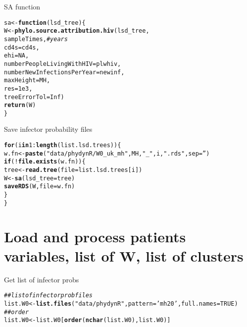 \documentclass[]{revtex4}\usepackage[]{graphicx}\usepackage[]{color}
\makeatletter
\newcommand{\hlnum}[1]{\textcolor[rgb]{0.686,0.059,0.569}{#1}}%
\newcommand{\hlstr}[1]{\textcolor[rgb]{0.192,0.494,0.8}{#1}}%
\newcommand{\hlcom}[1]{\textcolor[rgb]{0.678,0.584,0.686}{\textit{#1}}}%
\newcommand{\hlopt}[1]{\textcolor[rgb]{0,0,0}{#1}}%
\newcommand{\hlstd}[1]{\textcolor[rgb]{0.345,0.345,0.345}{#1}}%
\newcommand{\hlkwa}[1]{\textcolor[rgb]{0.161,0.373,0.58}{\textbf{#1}}}%
\newcommand{\hlkwb}[1]{\textcolor[rgb]{0.69,0.353,0.396}{#1}}%
\newcommand{\hlkwc}[1]{\textcolor[rgb]{0.333,0.667,0.333}{#1}}%
\newcommand{\hlkwd}[1]{\textcolor[rgb]{0.737,0.353,0.396}{\textbf{#1}}}%
\newenvironment{kframe}{%
 \def\at@end@of@kframe{}%
 \ifinner\ifhmode%
  \def\at@end@of@kframe{\end{minipage}}%
  \begin{minipage}{\columnwidth}%
 \fi\fi%
 \def\FrameCommand##1{\hskip\@totalleftmargin \hskip-\fboxsep
 \colorbox{shadecolor}{##1}\hskip-\fboxsep
     \hskip-\linewidth \hskip-\@totalleftmargin \hskip\columnwidth}%
 \MakeFramed {\advance\hsize-\width
   \@totalleftmargin\z@ \linewidth\hsize
   \@setminipage}}%
 {\par\unskip\endMakeFramed%
 \at@end@of@kframe}
\newenvironment{knitrout}{}{} %
\makeatother
\begin{document}
SA function
\begin{knitrout}
\color{fgcolor}\begin{kframe}
\begin{alltt}
\hlstd{sa} \hlkwb{<-} \hlkwa{function}\hlstd{(}\hlkwc{lsd_tree}\hlstd{)\{}
  \hlstd{W} \hlkwb{<-} \hlkwd{phylo.source.attribution.hiv}\hlstd{( lsd_tree,}
          \hlstd{sampleTimes,} \hlcom{# years}
          \hlkwc{cd4s} \hlstd{= cd4s,}
          \hlkwc{ehi} \hlstd{=} \hlnum{NA}\hlstd{,}
          \hlkwc{numberPeopleLivingWithHIV} \hlstd{= plwhiv,}
          \hlkwc{numberNewInfectionsPerYear} \hlstd{= newinf,}
          \hlkwc{maxHeight} \hlstd{= MH,}
          \hlkwc{res} \hlstd{=} \hlnum{1e3}\hlstd{,}
          \hlkwc{treeErrorTol} \hlstd{=} \hlnum{Inf}\hlstd{)}
  \hlkwd{return}\hlstd{(W)}
\hlstd{\}}
\end{alltt}
\end{kframe}
\end{knitrout}
Save infector probability files
\begin{knitrout}
\color{fgcolor}\begin{kframe}
\begin{alltt}
\hlkwa{for} \hlstd{(i} \hlkwa{in} \hlnum{1}\hlopt{:}\hlkwd{length}\hlstd{(list.lsd.trees))\{}
  \hlstd{w.fn} \hlkwb{<-} \hlkwd{paste}\hlstd{(}\hlstr{"data/phydynR/W0_uk_mh"}\hlstd{, MH,} \hlstr{"_"}\hlstd{,  i,} \hlstr{".rds"}\hlstd{,} \hlkwc{sep} \hlstd{=} \hlstr{''}\hlstd{)}
  \hlkwa{if}\hlstd{(}\hlopt{!}\hlkwd{file.exists}\hlstd{(w.fn))\{}
    \hlstd{tree} \hlkwb{<-} \hlkwd{read.tree}\hlstd{(}\hlkwc{file} \hlstd{= list.lsd.trees[i])}
    \hlstd{W} \hlkwb{<-} \hlkwd{sa}\hlstd{(}\hlkwc{lsd_tree} \hlstd{= tree)}
    \hlkwd{saveRDS}\hlstd{(W,} \hlkwc{file} \hlstd{= w.fn )}
  \hlstd{\}}
\hlstd{\}}
\end{alltt}
\end{kframe}
\end{knitrout}



\section*{Load and process patients variables, list of W, list of clusters}

Get list of infector probs
\begin{knitrout}
\color{fgcolor}\begin{kframe}
\begin{alltt}
\hlcom{## list of infector prob files}
\hlstd{list.W0} \hlkwb{<-} \hlkwd{list.files}\hlstd{(}\hlstr{"data/phydynR"}\hlstd{,} \hlkwc{pattern} \hlstd{=} \hlstr{'mh20'}\hlstd{,} \hlkwc{full.names} \hlstd{=} \hlnum{TRUE}\hlstd{)}
\hlcom{## order}
\hlstd{list.W0} \hlkwb{<-} \hlstd{list.W0[}\hlkwd{order}\hlstd{(}\hlkwd{nchar}\hlstd{(list.W0), list.W0)]}
\end{alltt}
\end{kframe}
\end{knitrout}
\end{document}

